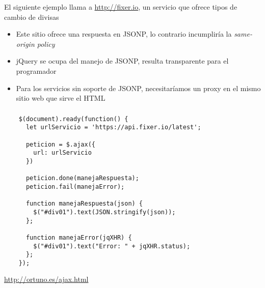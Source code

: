 \documentclass[ucs]{beamer}
\begin{document}
\begin{frame}[fragile]
El siguiente ejemplo llama a 
\url{http://fixer.io}, un servicio que ofrece tipos de cambio
de divisas

    \begin{itemize}
    \item
Este sitio ofrece una respuesta en JSONP, lo contrario incumpliría la 
\emph{same-origin policy}

    \item
jQuery se ocupa del manejo de JSONP, resulta transparente para el programador

    \item
Para los servicios sin soporte de JSONP, necesitaríamos un proxy en el
mismo sitio web que sirve el HTML

    \end{itemize}
\end{frame}


\begin{frame}[fragile]
\frametitle{}

  \begin{scriptsize}
  \begin{verbatim}
    $(document).ready(function() {
      let urlServicio = 'https://api.fixer.io/latest';

      peticion = $.ajax({
        url: urlServicio
      })

      peticion.done(manejaRespuesta);
      peticion.fail(manejaError);

      function manejaRespuesta(json) {
        $("#div01").text(JSON.stringify(json));
      };

      function manejaError(jqXHR) {
        $("#div01").text("Error: " + jqXHR.status);
      };
    });
  \end{verbatim}
  \end{scriptsize}
\begin{tiny}
\begin{flushright}
\url{http://ortuno.es/ajax.html}
\end{flushright}
\end{tiny}
\end{frame}
\end{document}
